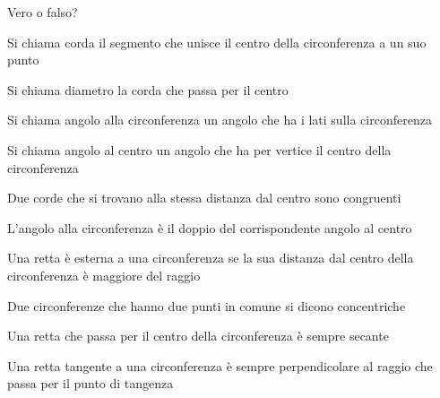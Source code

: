 \begin{esercizio}
\label{ese:5.5}
Vero o falso?
\begin{enumeratea}
\item Si chiama corda il segmento che unisce il centro della circonferenza a un suo punto\tab\hfill\boxV\quad\boxF
\item Si chiama diametro la corda che passa per il centro\hfill\boxV\quad\boxF
\item Si chiama angolo alla circonferenza un angolo che ha i lati sulla circonferenza\hfill\boxV\quad\boxF
\item Si chiama angolo al centro un angolo che ha per vertice il centro della circonferenza\tab\hfill\boxV\quad\boxF
\item Due corde che si trovano alla stessa distanza dal centro sono congruenti\hfill\boxV\quad\boxF
\item L’angolo alla circonferenza è il doppio del corrispondente angolo al centro\hfill\boxV\quad\boxF
\item Una retta è esterna a una circonferenza se la sua distanza dal centro della circonferenza è maggiore del raggio\hfill\boxV\quad\boxF
\item Due circonferenze che hanno due punti in comune si dicono concentriche\hfill\boxV\quad\boxF
\item Una retta che passa per il centro della circonferenza è sempre secante\hfill\boxV\quad\boxF
\item Una retta tangente a una circonferenza è sempre perpendicolare al raggio che passa per il punto di tangenza\hfill\boxV\quad\boxF
\end{enumeratea}
\end{esercizio}

